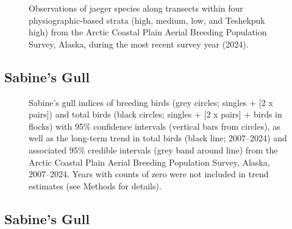 \documentclass[
]{article}
\begin{document}
\begin{figure}


\caption{\label{fig-JAEGmap}Observations of jaeger species along
transects within four physiographic-based strata (high, medium, low, and
Teshekpuk high) from the Arctic Coastal Plain Aerial Breeding Population
Survey, Alaska, during the most recent survey year (2024).}

\end{figure}%

\newpage{}

\subsection*{Sabine's Gull}\label{sabines-gull}

\begin{figure}


\caption{\label{fig-SAGU}Sabine's gull indices of breeding birds (grey
circles; singles + {[}2 x pairs{]}) and total birds (black circles;
singles + {[}2 x pairs{]} + birds in flocks) with 95\% confidence
intervals (vertical bars from circles), as well as the long-term trend
in total birds (black line; 2007--2024) and associated 95\% credible
intervals (grey band around line) from the Arctic Coastal Plain Aerial
Breeding Population Survey, Alaska, 2007--2024. Years with counts of
zero were not included in trend estimates (see Methods for details).}

\end{figure}%

\newpage{}

\subsection*{Sabine's Gull}\label{sabines-gull-1}

\begingroup\fontsize{10}{12}\selectfont
\end{document}
